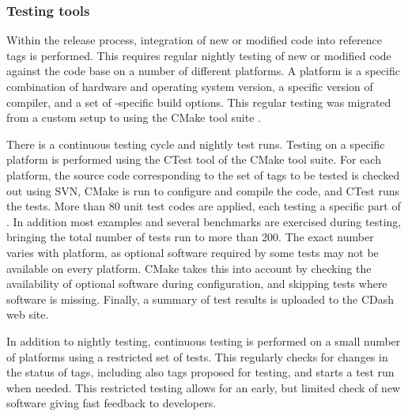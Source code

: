 
\subsubsection{Testing tools}
Within the release process, integration of new or modified code into reference
tags is performed.  This requires regular nightly testing of new or modified 
code against the code base on a number of different platforms.  A platform is a 
specific combination of hardware and operating system version, a specific 
version of compiler, and a set of \Gfour{}-specific build options.  This regular
testing was migrated from a custom setup to using the CMake tool suite 
\cite{release:cdash}.  

There is a continuous testing cycle and nightly test runs.  Testing on a
specific platform is performed using the CTest tool of the CMake tool suite. 
For each platform, the source code corresponding to the set of tags to be tested
is checked out using SVN, CMake is run to configure and compile the code, and 
CTest runs the tests.  More than 80 unit test codes are applied, each testing a 
specific part of \Gfour{}.  In addition most examples and several benchmarks are
exercised during testing, bringing the total number of tests run to more than 
200. The exact number varies with platform, as optional software required by 
some tests may not be available on every platform.  CMake takes this into 
account by checking the availability of optional software during configuration, 
and skipping tests where software is missing.  Finally, a summary of test 
results is uploaded to the CDash web site.
  
In addition to nightly testing, continuous testing is performed on a small 
number of platforms using a restricted set of tests.  This regularly checks for 
changes in the status of tags, including also tags proposed for testing, and 
starts a test run when needed.  This restricted testing allows for an early,
but limited check of new software giving fast feedback to developers.

